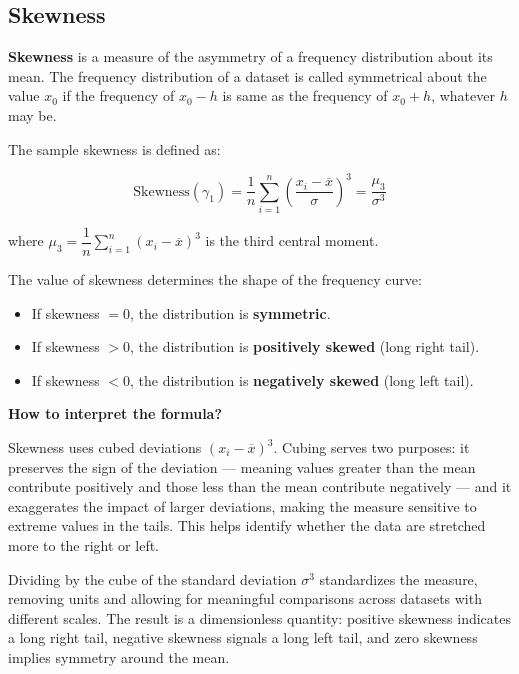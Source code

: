 \documentclass[twoside]{book}
\begin{document}
\subsection{Skewness}

\textbf{Skewness} is a measure of the asymmetry of a frequency distribution about its mean. The frequency distribution of a dataset is called symmetrical about the value $x_0$ if the frequency of $x_0-h$ is same as the frequency of $x_0+h$, whatever $h$ may be.


The sample skewness is defined as:
\begin{textbox}
\[
\text{Skewness} (\gamma_1) = \frac{1}{n} \sum_{i=1}^n \left( \frac{x_i - \overline{x}}{\sigma} \right)^3 = \frac{\mu_3}{\sigma^3}
\]
\end{textbox}
where \(\mu_3 = \dfrac{1}{n} \sum_{i=1}^n (x_i - \overline{x})^3\) is the third central moment.

The value of skewness determines the shape of the frequency curve:
\begin{itemize}
    \item If skewness \( = 0 \), the distribution is \textbf{symmetric}.
    \item If skewness \( > 0 \), the distribution is \textbf{positively skewed} (long right tail).
    \item If skewness \( < 0 \), the distribution is \textbf{negatively skewed} (long left tail).
\end{itemize}

\textbf{How to interpret the formula?}

Skewness uses cubed deviations $(x_i - \overline{x})^3$. Cubing serves two purposes: it preserves the sign of the deviation — meaning values greater than the mean contribute positively and those less than the mean contribute negatively — and it exaggerates the impact of larger deviations, making the measure sensitive to extreme values in the tails. This helps identify whether the data are stretched more to the right or left.

Dividing by the cube of the standard deviation $\sigma^3$ standardizes the measure, removing units and allowing for meaningful comparisons across datasets with different scales. The result is a dimensionless quantity: positive skewness indicates a long right tail, negative skewness signals a long left tail, and zero skewness implies symmetry around the mean.
\end{document}

